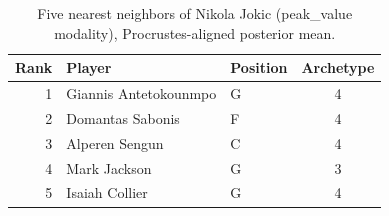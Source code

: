 \begin{table}[htbp]
  \centering\small
  \begin{tabular}{rllc}
    \toprule
    Rank & Player & Position & Archetype \\
    \midrule
    1 & Giannis Antetokounmpo & G & 4 \\
    2 & Domantas Sabonis & F & 4 \\
    3 & Alperen Sengun & C & 4 \\
    4 & Mark Jackson & G & 3 \\
    5 & Isaiah Collier & G & 4 \\
    \bottomrule
  \end{tabular}
  \caption{Five nearest neighbors of Nikola Jokic (peak_value modality), Procrustes-aligned posterior mean.}
  \label{tab:Nikola_Jokic_neighbors_peak_value}
\end{table}

